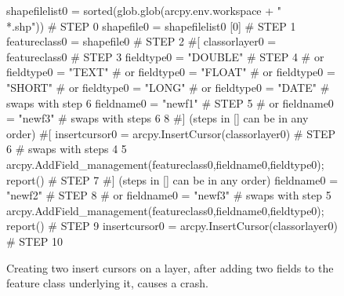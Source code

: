 \begin{figure}
{\scriptsize 
\begin{code}
shapefilelist0 = sorted(glob.glob(arcpy.env.workspace + "\\*.shp"))                   \# STEP 0
shapefile0 = shapefilelist0 [0]                                                      \# STEP 1
featureclass0 = shapefile0                                                           \# STEP 2
\#[
classorlayer0 = featureclass0                                                        \# STEP 3
fieldtype0 = "DOUBLE"                                                                \# STEP 4
\#  or fieldtype0 = "TEXT"
\#  or fieldtype0 = "FLOAT"
\#  or fieldtype0 = "SHORT"
\#  or fieldtype0 = "LONG"
\#  or fieldtype0 = "DATE"
\#  swaps with step 6
fieldname0 = "newf1"                                                                 \# STEP 5
\#  or fieldname0 = "newf3"
\#  swaps with steps 6 8
\#] (steps in [] can be in any order)
\#[
insertcursor0 = arcpy.InsertCursor(classorlayer0)                                    \# STEP 6
\#  swaps with steps 4 5
arcpy.AddField\_management(featureclass0,fieldname0,fieldtype0); report()             \# STEP 7
\#] (steps in [] can be in any order)
fieldname0 = "newf2"                                                                 \# STEP 8
\#  or fieldname0 = "newf3"
\#  swaps with step 5
arcpy.AddField\_management(featureclass0,fieldname0,fieldtype0); report()             \# STEP 9
insertcursor0 = arcpy.InsertCursor(classorlayer0)                                    \# STEP 10
\end{code}
}
\caption{Creating two insert cursors on a layer, after adding two fields to the feature class underlying it, causes a crash.}
\label{fault3}
\end{figure}

